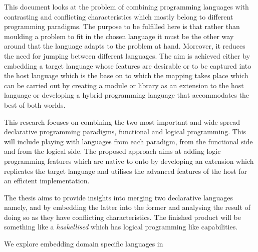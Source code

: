 \begin{unbcabstract}
This document looks at the problem of combining programming languages with contrasting and conflicting 
characteristics which mostly belong to different pro\-gram\-ming pa\-ra\-digms. The purpose to be fulfilled here is that 
rather than moulding a problem to fit in the chosen language it must be the other way around that the language 
adapts to the problem at hand. Moreover, it reduces the need for jumping between different  languages. The aim is 
achieved either by embedding a target language  whose features are desirable or to be captured into the host 
language which is the base on to which the mapping takes place which can be carried out by creating a module or 
library as an extension to the host language or developing a hybrid programming language that accommodates the 
best of both worlds.  

This research focuses on combining the two most important and wide spread declarative programming paradigms, 
functional and logical programming. This will include playing with languages from each paradigm, 
 from the functional side and  from the logical side. The proposed approach 
aims at adding logic programming features which are native to  onto  by 
developing an extension which replicates the target language and utilises the advanced features of the host for an 
efficient implementation.      

The thesis  aims to provide insights into merging two declarative languages namely,  and  by embedding 
the latter into the former and analysing the result of doing so as they have conflicting characteristics. The finished product will be 
something like a \textit{haskellised}  which has logical programming like capabilities.       

We explore embedding domain specific languages in  

       
\end{unbcabstract}

